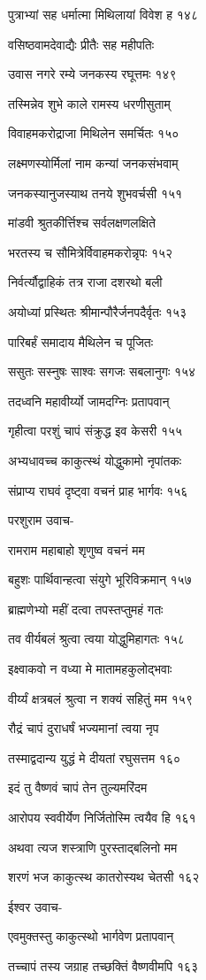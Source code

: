 पुत्राभ्यां सह धर्मात्मा मिथिलायां विवेश ह १४८

वसिष्ठवामदेवाद्यैः प्रीतैः सह महीपतिः

उवास नगरे रम्ये जनकस्य रघूत्तमः १४९

तस्मिन्नेव शुभे काले रामस्य धरणीसुताम्

विवाहमकरोद्राजा मिथिलेन समर्चितः १५०

लक्ष्मणस्योर्मिलां नाम कन्यां जनकसंभवाम्

जनकस्यानुजस्याथ तनये शुभवर्चसी १५१

मांडवी श्रुतकीर्त्तिश्च सर्वलक्षणलक्षिते

भरतस्य च सौमित्रेर्विवाहमकरोन्नृपः १५२

निर्वर्त्यौद्वाहिकं तत्र राजा दशरथो बली

अयोध्यां प्रस्थितः श्रीमान्पौरैर्जनपदैर्वृतः १५३

पारिबर्हं समादाय मैथिलेन च पूजितः

ससुतः सस्नुषः साश्वः सगजः सबलानुगः १५४

तदध्वनि महावीर्य्यो जामदग्निः प्रतापवान्

गृहीत्वा परशुं चापं संक्रुद्ध इव केसरी १५५

अभ्यधावच्च काकुत्स्थं योद्धुकामो नृपांतकः

संप्राप्य राघवं दृष्ट्वा वचनं प्राह भार्गवः १५६

परशुराम उवाच-

रामराम महाबाहो शृणुष्व वचनं मम

बहुशः पार्थिवान्हत्वा संयुगे भूरिविक्रमान् १५७

ब्राह्मणेभ्यो महीं दत्वा तपस्तप्तुमहं गतः

तव वीर्यबलं श्रुत्वा त्वया योद्धुमिहागतः १५८

इक्ष्वाकवो न वध्या मे मातामहकुलोद्भवाः

वीर्य्यं क्षत्रबलं श्रुत्वा न शक्यं सहितुं मम १५९

रौद्रं चापं दुराधर्षं भज्यमानां त्वया नृप

तस्माद्वदान्य युद्धं मे दीयतां रघुसत्तम १६०

इदं तु वैष्णवं चापं तेन तुल्यमरिंदम

आरोपय स्ववीर्येण निर्जितोस्मि त्वयैव हि १६१

अथवा त्यज शस्त्राणि पुरस्ताद्बलिनो मम

शरणं भज काकुत्स्थ कातरोस्यथ चेतसी १६२

ईश्वर उवाच-

एवमुक्तस्तु काकुत्स्थो भार्गवेण प्रतापवान्

तच्चापं तस्य जग्राह तच्छक्तिं वैष्णवीमपि १६३

